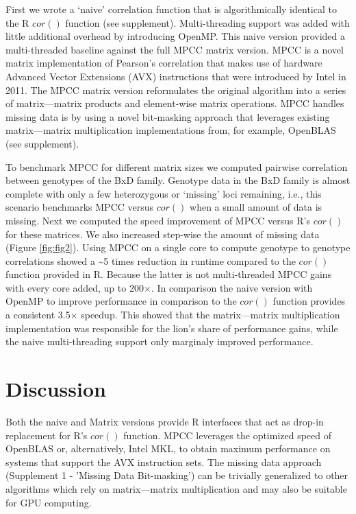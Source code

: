 \documentclass{bioinfo}
\begin{document}
First we wrote a `naive' correlation function that is algorithmically
identical to the R $cor()$ function (see supplement). Multi-threading
support was added with little additional overhead by introducing
OpenMP. This naive version provided a multi-threaded baseline against
the full MPCC matrix version.  MPCC is a novel matrix implementation
of Pearson's correlation that makes use of hardware Advanced Vector
Extensions (AVX) instructions that were introduced by Intel in 2011.
The MPCC matrix version reformulates the original algorithm into a
series of matrix---matrix products and element-wise matrix
operations. MPCC handles missing data is by using a novel bit-masking
approach that leverages existing matrix---matrix multiplication
implementations from, for example, OpenBLAS (see supplement).

To benchmark MPCC for different matrix sizes we computed pairwise
correlation between genotypes of the BxD family.  Genotype data in the
BxD family is almost complete with only a few heterozygous or
`missing' loci remaining, i.e., this scenario benchmarks MPCC versus
$cor()$ when a small amount of data is missing.  Next we computed the
speed improvement of MPCC versus R's $cor()$ for these matrices. We
also increased step-wise the amount of missing data
(Figure \ref{fig:fig2}). Using MPCC on a single core to compute
genotype to genotype correlations showed a \textasciitilde{}5 times
reduction in runtime compared to the $cor()$ function provided in R.
Because the latter is not multi-threaded MPCC gains with every core
added, up to 200$\times$.  In comparison the naive version with OpenMP
to improve performance in comparison to the $cor()$ function provides
a consistent 3.5$\times$ speedup. This showed that the matrix---matrix 
multiplication implementation was responsible for the lion's share of 
performance gains, while the naive multi-threading support only marginaly 
improved performance.

\section{Discussion}

Both the naive and Matrix versions provide R interfaces that act as
drop-in replacement for R's $cor()$ function.  MPCC leverages the
optimized speed of OpenBLAS or, alternatively, Intel\textregistered{}
MKL, to obtain maximum performance on systems that support the
AVX instruction sets.  The missing data
approach (Supplement 1 - 'Missing Data Bit-masking') can be trivially
generalized to other algorithms which rely on matrix---matrix
multiplication and may also be suitable for GPU computing.
\end{document}
